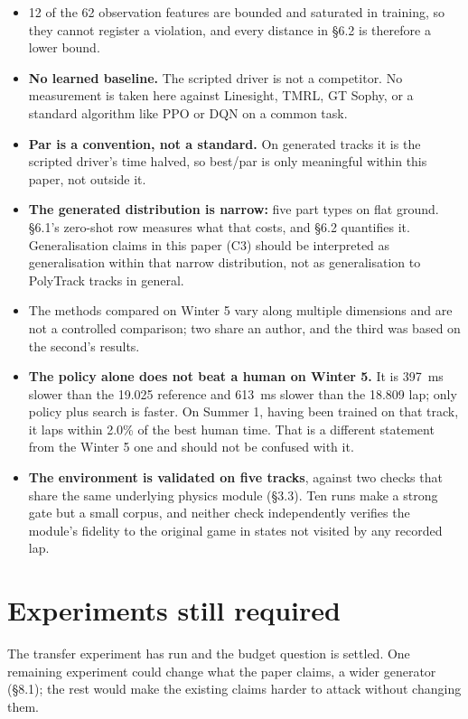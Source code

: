\documentclass[11pt]{article}
\begin{document}
\begin{itemize}[leftmargin=*]
\item 12 of the 62 observation features are bounded and saturated in training, so they cannot register a violation, and every distance in \S6.2 is therefore a lower bound.
\item \textbf{No learned baseline.} The scripted driver is not a competitor. No measurement is taken here against Linesight, TMRL, GT Sophy, or a standard algorithm like PPO or DQN on a common task.
\item \textbf{Par is a convention, not a standard.} On generated tracks it is the scripted driver's time halved, so best/par is only meaningful within this paper, not outside it.
\item \textbf{The generated distribution is narrow:} five part types on flat ground. \S6.1's zero-shot row measures what that costs, and \S6.2 quantifies it. Generalisation claims in this paper (C3) should be interpreted as generalisation within that narrow distribution, not as generalisation to PolyTrack tracks in general.
\item The methods compared on Winter 5 vary along multiple dimensions and are not a controlled comparison; two share an author, and the third was based on the second's results.
\item \textbf{The policy alone does not beat a human on Winter 5.} It is 397~ms slower than the 19.025 reference and 613~ms slower than the 18.809 lap; only policy plus search is faster. On Summer 1, having been trained on that track, it laps within 2.0\% of the best human time. That is a different statement from the Winter 5 one and should not be confused with it.
\item \textbf{The environment is validated on five tracks}, against two checks that share the same underlying physics module (\S3.3). Ten runs make a strong gate but a small corpus, and neither check independently verifies the module's fidelity to the original game in states not visited by any recorded lap.
\end{itemize}

\section{Experiments still required}

The transfer experiment has run and the budget question is settled. One remaining experiment could change what the paper claims, a wider generator (\S8.1); the rest would make the existing claims harder to attack without changing them.
\end{document}
